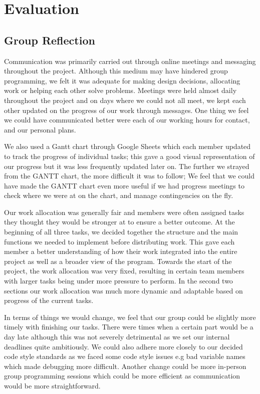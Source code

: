\documentclass[11pt]{article}
\begin{document}
  \section*{Evaluation}

  \subsection*{Group Reflection}

Communication was primarily carried out through online meetings and messaging throughout the project. Although this medium may have hindered group programming, we felt it was adequate for making design decisions, allocating work or helping each other solve problems. Meetings were held almost daily throughout the project and on days where we could not all meet, we kept each other updated on the progress of our work through messages. One thing we feel we could have communicated better were each of our working hours for contact, and our personal plans. 

We also used a Gantt chart through Google Sheets which each member updated to track the progress of individual tasks; this gave a good visual representation of our progress but it was less frequently updated later on. The further we strayed from the GANTT chart, the more difficult it was to follow; We feel that we could have made the GANTT chart even more useful if we had progress meetings to check where we were at on the chart, and manage contingencies on the fly. 

Our work allocation was generally fair and members were often assigned tasks they thought they would be stronger at to ensure a better outcome. At the beginning of all three tasks, we decided together the structure and the main functions we needed to implement before distributing work. This gave each member a better understanding of how their work integrated into the entire project as well as a broader view of the program. Towards the start of the project, the work allocation was very fixed, resulting in certain team members with larger tasks being under more pressure to perform. In the second two sections our work allocation was much more dynamic and adaptable based on progress of the current tasks.

In terms of things we would change, we feel that our group could be slightly more timely with finishing our tasks. There were times when a certain part would be a day late although this was not severely detrimental as we set our internal deadlines quite ambitiously. We could also adhere more closely to our decided code style standards as we faced some code style issues e.g bad variable names which made debugging more difficult. Another change could be more in-person group programming sessions which could be more efficient as communication would be more straightforward.
\end{document}

